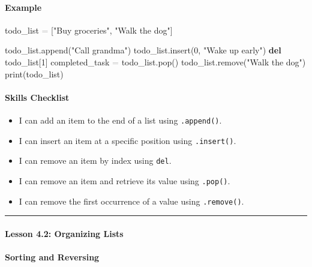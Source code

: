 \documentclass[
  justified,
  openright,
]{tufte-book}
\let\subsection\paragraph
\let\paragraph\paragraph
\newcommand{\KeywordTok}[1]{\textcolor{CodeKeyword}{\textbf{#1}}}  %
\newcommand{\StringTok}[1]{\textcolor{CodeString}{#1}}              %
\newcommand{\CodeNumTok}[1]{\textcolor{CodeNumber}{#1}}             %
\newcommand{\OperatorTok}[1]{\textcolor{DarkGray}{#1}}              %
\newenvironment{Shaded}{%
  \begin{mdframed}[style=TufteCode]%
}{%
  \end{mdframed}%
}
\let\subsection\paragraph
\let\paragraph\paragraph
\providecommand{\tightlist}{%
  \setlength{\itemsep}{0pt}\setlength{\parskip}{0pt}}
\begin{document}
\subsection{Example}\label{example}

\begin{Shaded}
\begin{Highlighting}[]
todo\_list \OperatorTok{=} [\StringTok{"Buy groceries"}, \StringTok{"Walk the dog"}]
 
todo\_list.append(\StringTok{"Call grandma"})
todo\_list.insert(\CodeNumTok{0}, \StringTok{"Wake up early"})
\KeywordTok{del} todo\_list[\CodeNumTok{1}]
completed\_task \OperatorTok{=} todo\_list.pop()
todo\_list.remove(\StringTok{"Walk the dog"})
print(todo\_list)
\end{Highlighting}
\end{Shaded}

\subsection{Skills Checklist}\label{skills-checklist-17}

\begin{itemize}
\tightlist
\item[$\square$]
  I can add an item to the end of a list using \texttt{.append()}.
\item[$\square$]
  I can insert an item at a specific position using \texttt{.insert()}.
\item[$\square$]
  I can remove an item by index using \texttt{del}.
\item[$\square$]
  I can remove an item and retrieve its value using \texttt{.pop()}.
\item[$\square$]
  I can remove the first occurrence of a value using \texttt{.remove()}.
\end{itemize}

\begin{center}\rule{0.5\linewidth}{0.5pt}\end{center}

\subsection{Lesson 4.2: Organizing
Lists}\label{lesson-4.2-organizing-lists}

\subsection{Sorting and Reversing}\label{sorting-and-reversing}
\end{document}
